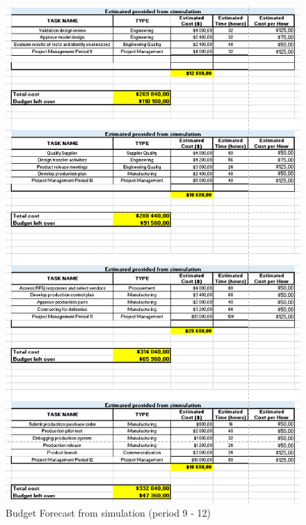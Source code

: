 \begin{appendices}
\begin{figure}[H]
\includegraphics[scale=0.8]{forecast/budget_forecast_sim_9101112.PNG}
\caption{Budget Forecast from simulation (period 9 - 12)}
\end{figure}

\end{appendices}
